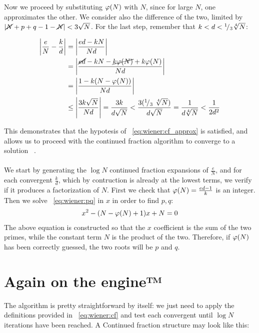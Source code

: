 Now we proceed by substituting $\varphi(N)$ with $N$, since for large $N$, one
approximates the other. We consider also the difference of the two, limited by
$\left|\cancel{N} + p + q - 1 - \cancel{N}\right| < 3\sqrt{N}$.
For the last step, remember that $k < d < {}^{1}\!/_{3}\sqrt[4]{N}$:

\begin{align*}
  \left|\frac{e}{N} - \frac{k}{d}\right| &= \left|\frac{ed - kN}{Nd}\right| \\
  &= \left|\frac{\cancel{ed} -kN - \cancel{k\varphi(N)} + k\varphi(N)}{Nd}\right| \\
  &= \left|\frac{1-k(N-\varphi(N))}{Nd}\right| \\
  &\leq \left|\frac{3k\sqrt{N}}{Nd}\right|
  = \frac{3k}{d\sqrt{N}}
  < \frac{3({}^{1}\!/_{3}\ \sqrt[4]{N})}{d\sqrt{N}}
  = \frac{1}{d\sqrt[4]{N}} < \frac{1}{2d^2}
\end{align*}

This demonstrates that the hypotesis of ~\ref{eq:wiener:cf_approx} is satisfied,
and allows us to proceed with the continued fraction algorithm to converge to a
solution ~\cite{20years}.

\paragraph{}
We start by generating the $\log N$ continued fraction expansions of
$\frac{e}{N}$, and for each convergent $\frac{k}{d}$,
which by contruction is already at the lowest terms, we verify if it produces a
factorization of $N$.
First we check that $\varphi(N) = \frac{ed-1}{k}$ is
an integer. Then we solve ~\ref{eq:wiener:pq} in $x$ in order to find $p, q$:
\begin{align}
  \label{eq:wiener:pq}
  x^2 - (N - \varphi(N) + 1)x + N = 0
\end{align}
The above equation is constructed so that the $x$ coefficient is the sum of the
two primes, while the constant term $N$ is the product of the two. Therefore, if
$\varphi(N)$ has been correctly guessed, the two roots will be $p$ and $q$.

\section{Again on the engine™}

The algorithm is pretty straightforward by itself: we just need to apply the
definitions provided in ~\ref{eq:wiener:cf} and test each convergent until
$\log N$ iterations have been reached.
A Continued fraction structure may look like this:


